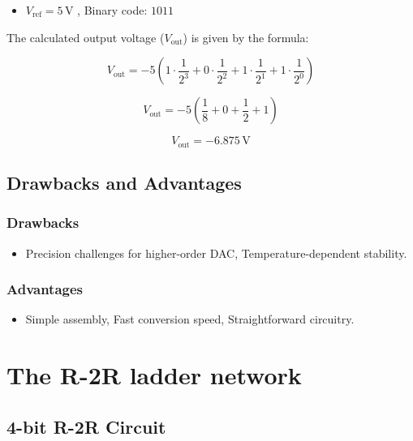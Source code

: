 \documentclass{article}
\begin{document}
\begin{itemize}
    \item \( V_{\text{ref}} = 5 \, \text{V} \) , Binary code: \( 1011 \)
\end{itemize}

The calculated output voltage (\( V_{\text{out}} \)) is given by the formula:


{\fontsize{10}{6}\selectfont
\begin{equation}
    V_{\text{out}} = -5 \left( 1 \cdot \frac{1}{2^3} + 0 \cdot \frac{1}{2^2} + 1 \cdot \frac{1}{2^1} + 1 \cdot \frac{1}{2^0} \right)
\end{equation}

\begin{equation}
    V_{\text{out}} = -5 \left( \frac{1}{8} + 0 + \frac{1}{2} + 1 \right)
\end{equation}

\begin{equation}
    V_{\text{out}} = -6.875 \, \text{V}
\end{equation}
}
\subsection{Drawbacks and Advantages}

\subsubsection{Drawbacks}
\begin{itemize}
    \item Precision challenges for higher-order DAC, Temperature-dependent stability.
\end{itemize}

\subsubsection{Advantages}
\begin{itemize}
    \item Simple assembly, Fast conversion speed, Straightforward circuitry.
\end{itemize}


\section{The R-2R ladder network}
\fontsize{14}{16}\selectfont

\subsection{ 4-bit R-2R Circuit}
\end{document}
